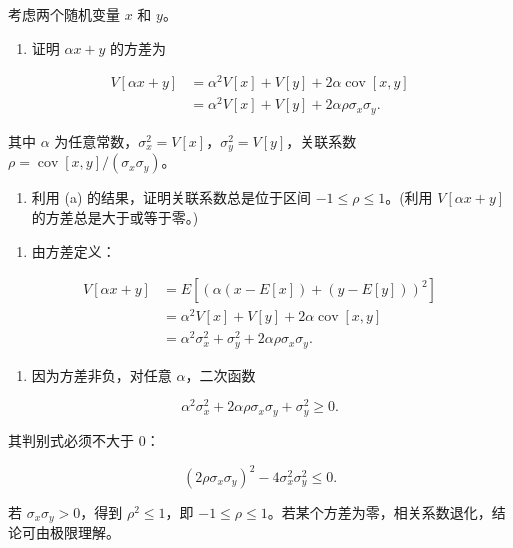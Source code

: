 \begin{question}
考虑两个随机变量 \(x\) 和 \(y\)。

\begin{enumerate}
\item
  证明 \(\alpha x+y\) 的方差为
\end{enumerate}

\[
\begin{split}
V[\alpha x+y]&=\alpha^2 V[x]+V[y]+2\alpha\operatorname{cov}[x,y]\\
&=\alpha^2 V[x]+V[y]+2\alpha\rho\sigma_x\sigma_y.
\end{split}
\]

其中 \(\alpha\) 为任意常数，\(\sigma_x^2=V[x]\)，\(\sigma_y^2=V[y]\)，关联系数 \(\rho=\operatorname{cov}[x,y]/(\sigma_x\sigma_y)\)。

\begin{enumerate}[start=2]
\item 利用 (a) 的结果，证明关联系数总是位于区间 \(-1\le \rho\le 1\)。(利用 \(V[\alpha x+y]\) 的方差总是大于或等于零。)
\end{enumerate}
\begin{solution}
\begin{enumerate}
\item
  由方差定义：
\end{enumerate}

\[
\begin{split}
V[\alpha x+y]
&=E[(\alpha(x-E[x])+(y-E[y]))^2]\\
&=\alpha^2V[x]+V[y]+2\alpha\operatorname{cov}[x,y]\\
&=\alpha^2\sigma_x^2+\sigma_y^2+2\alpha\rho\sigma_x\sigma_y.
\end{split}
\]

\begin{enumerate}[start=2]
\item
  因为方差非负，对任意 \(\alpha\)，二次函数
\end{enumerate}

\[
\alpha^2\sigma_x^2+2\alpha\rho\sigma_x\sigma_y+
\sigma_y^2\ge0.
\]

其判别式必须不大于 0：

\[
(2\rho\sigma_x\sigma_y)^2-4\sigma_x^2\sigma_y^2\le0.
\]

若 \(\sigma_x\sigma_y>0\)，得到 \(\rho^2\le1\)，即
\(-1\le\rho\le1\)。若某个方差为零，相关系数退化，结论可由极限理解。
\end{solution}
\end{question}



